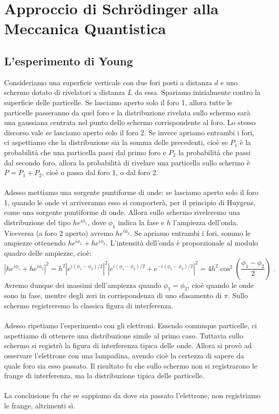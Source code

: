 \documentclass[12pt,a4paper]{report}
\theoremstyle{definition}
\numberwithin{equation}{section}
\begin{document}
\chapter{Approccio di Schrödinger alla Meccanica Quantistica}
\section{L'esperimento di Young}
Consideriamo una superficie verticale con due fori posti a distanza $d$ e uno schermo dotato di rivelatori a distanza $L$ da essa. Spariamo inizialmente contro la superficie delle particelle. Se lasciamo aperto solo il foro 1, allora tutte le particelle passeranno da quel foro e la distribuzione rivelata sullo schermo sarà una gaussiana centrata nel punto dello schermo corrispondente al foro. Lo stesso discorso vale se lasciamo aperto solo il foro 2. Se invece apriamo entrambi i fori, ci aspettiamo che la distribuzione sia la somma delle precedenti, cioè se $P_1$ è la probabilità che una particella passi dal primo foro e $P_2$ la probabilità che passi dal secondo foro, allora la probabilità di rivelare una particella sullo schermo è $P=P_1+P_2$, cioè o passa dal foro 1, o dal foro 2. \\
\\
Adesso mettiamo una sorgente puntiforme di onde: se lasciamo aperto solo il foro 1, quando le onde vi arriveranno esso si comporterà, per il principio di Huygens, come una sorgente puntiforme di onde. Allora sullo schermo riveleremo una distribuzione del tipo $h e^{i\phi_1}$, dove $\phi_1$ indica la fase e $h$ l'ampiezza dell'onda. Viceversa (a foro 2 aperto) avremo $h e^{i\phi_2}$. Se apriamo entrambi i fori, sommo le ampiezze ottenendo $he^{i\phi_1}+he^{i\phi_2}$. L'intensità dell'onda è proporzionale al modulo quadro delle ampiezze, cioè:
$$
\left|he^{i\phi_1}+he^{i\phi_2}\right|^2=h^2\left|e^{i(\phi_1-\phi_2)/2}\right|^2\left|e^{i(\phi_1-\phi_2)/2}+e^{-i(\phi_1-\phi_2)/2}\right|^2=4h^2\cos^2\left(\frac{\phi_1-\phi_2}{2}\right)\;.
$$
Avremo dunque dei massimi dell'ampiezza quando $\phi_1=\phi_2$, cioè quando le onde sono in fase, mentre degli zeri in corrispondenza di uno sfasamento di $\pi$. Sullo schermo registreremo la classica figura di interferenza. \\
\\
Adesso ripetiamo l'esperimento con gli elettroni. Essendo comunque particelle, ci aspettiamo di ottenere una distribuzione simile al primo caso. Tuttavia sullo schermo si registrò la figura di interferenza tipica delle onde. Allora si provò ad osservare l'elettrone con una lampadina, avendo cioè la certezza di sapere da quale foro sia esso passato. Il risultato fu che sullo schermo non si registrarono le frange di interferenza, ma la distribuzione tipica delle particelle. \\
\\
La conclusione fu che se sappiamo da dove sia passato l'elettrone, non registriamo le frange, altrimenti sì.
\end{document}
